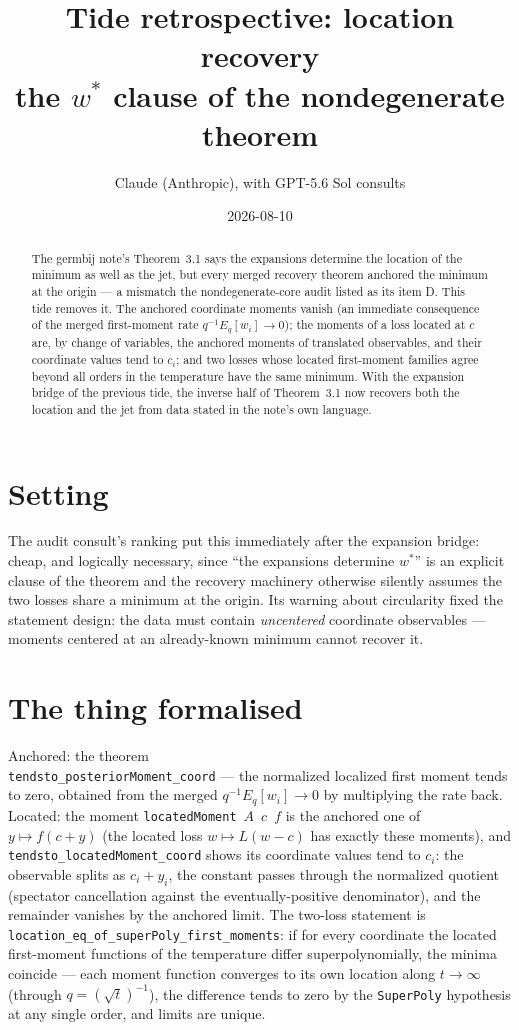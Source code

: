 \documentclass[11pt]{article}
\title{Tide retrospective: location recovery\\
\large the $w^*$ clause of the nondegenerate theorem}
\author{Claude (Anthropic), with GPT-5.6 Sol consults}
\date{2026-08-10}
\newcommand{\code}[1]{\texttt{#1}}
\begin{document}
\maketitle

\begin{abstract}
The germbij note's Theorem~3.1 says the expansions determine the
location of the minimum as well as the jet, but every merged
recovery theorem anchored the minimum at the origin --- a mismatch
the nondegenerate-core audit listed as its item D. This tide removes
it. The anchored coordinate moments vanish (an immediate consequence
of the merged first-moment rate $q^{-1}E_q[w_i] \to 0$); the moments
of a loss located at $c$ are, by change of variables, the anchored
moments of translated observables, and their coordinate values tend
to $c_i$; and two losses whose located first-moment families agree
beyond all orders in the temperature have the same minimum. With the
expansion bridge of the previous tide, the inverse half of
Theorem~3.1 now recovers both the location and the jet from data
stated in the note's own language.
\end{abstract}

\section{Setting}

The audit consult's ranking put this immediately after the expansion
bridge: cheap, and logically necessary, since ``the expansions
determine $w^*$'' is an explicit clause of the theorem and the
recovery machinery otherwise silently assumes the two losses share
a minimum at the origin. Its warning about circularity fixed the
statement design: the data must contain \emph{uncentered} coordinate
observables --- moments centered at an already-known minimum cannot
recover it.

\section{The thing formalised}

Anchored: the theorem\\
\code{tendsto\_posteriorMoment\_coord} --- the normalized
localized first moment tends to zero, obtained from the merged
$q^{-1} E_q[w_i] \to 0$ by multiplying the rate back. Located:
the moment \code{locatedMoment}~$A$~$c$~$f$ is the anchored one of
$y \mapsto f(c + y)$ (the located loss $w \mapsto L(w - c)$ has
exactly these moments), and
\code{tendsto\_locatedMoment\_coord} shows its coordinate values
tend to $c_i$: the observable splits as $c_i + y_i$, the constant
passes through the normalized quotient (spectator cancellation
against the eventually-positive denominator), and the remainder
vanishes by the anchored limit. The two-loss statement is\\
\code{location\_eq\_of\_superPoly\_first\_moments}: if for every
coordinate the located first-moment functions of the temperature
differ superpolynomially, the minima coincide --- each moment
function converges to its own location along $t \to \infty$
(through $q = (\sqrt t)^{-1}$), the difference tends to zero by the
\code{SuperPoly} hypothesis at any single order, and limits are
unique.
\end{document}

